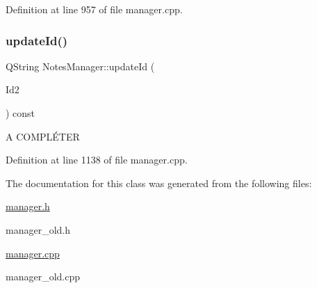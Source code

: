Definition at line 957 of file manager.\+cpp.

\mbox{\label{class_notes_manager_a2a8aba4f2f40239fce1b541a10b92a7e}} 
\subsubsection{\texorpdfstring{update\+Id()}{updateId()}}
{\footnotesize\ttfamily Q\+String Notes\+Manager\+::update\+Id (\begin{DoxyParamCaption}\item[{Q\+String}]{Id2 }\end{DoxyParamCaption}) const}

A C\+O\+M\+P\+LÉ\+T\+ER 

Definition at line 1138 of file manager.\+cpp.



The documentation for this class was generated from the following files\+:\begin{DoxyCompactItemize}
\item 
\hyperlink{manager_8h}{manager.\+h}\item 
manager\+\_\+old.\+h\item 
\hyperlink{manager_8cpp}{manager.\+cpp}\item 
manager\+\_\+old.\+cpp\end{DoxyCompactItemize}
